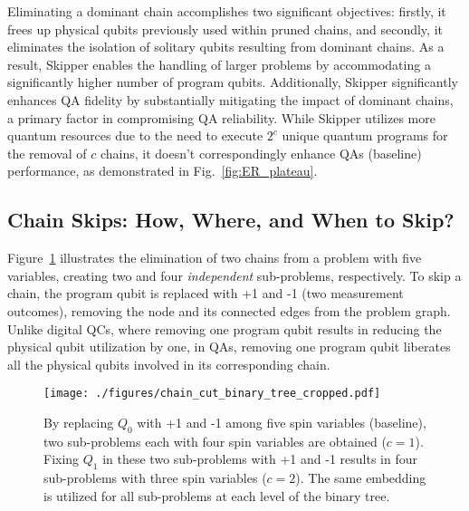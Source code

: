 Eliminating a dominant chain accomplishes two significant objectives: firstly, it frees up physical qubits previously used within pruned chains, and secondly, it eliminates the isolation of solitary qubits resulting from dominant chains.
As a result, Skipper enables the handling of larger problems by accommodating a significantly higher number of program qubits. 
Additionally, Skipper significantly enhances QA fidelity by substantially mitigating the impact of dominant chains, a primary factor in compromising QA reliability.
While Skipper utilizes more quantum resources due to the need to execute $2^c$ unique quantum programs for the removal of $c$ chains, it doesn't correspondingly enhance QAs (baseline) performance, as demonstrated in Fig.~\ref{fig:ER_plateau}. 


\subsection{Chain Skips: How, Where, and When to Skip?}

Figure~\ref{fig:chain_cut_binary_tree} illustrates the elimination of two chains from a problem with five variables, creating two and four \emph{independent} sub-problems, respectively. 
To skip a chain, the program qubit is replaced with +1 and -1 (two measurement outcomes), removing the node and its connected edges from the problem graph.
Unlike digital QCs, where removing one program qubit results in reducing the physical qubit utilization by one, in QAs, removing one program qubit liberates all the physical qubits involved in its corresponding chain. 


\begin{figure}[h]
    \centering
    \texttt{[image: ./figures/chain\_cut\_binary\_tree\_cropped.pdf]}
    \caption{        
        By replacing $Q_0$ with +1 and -1 among five spin variables (baseline), two sub-problems each with four spin variables are obtained ($c=1$). 
        Fixing $Q_1$ in these two sub-problems with +1 and -1 results in four sub-problems with three spin variables ($c=2$).
        The same embedding is utilized for all sub-problems at each level of the binary tree. 
}           
    \label{fig:chain_cut_binary_tree} 
\end{figure}  




